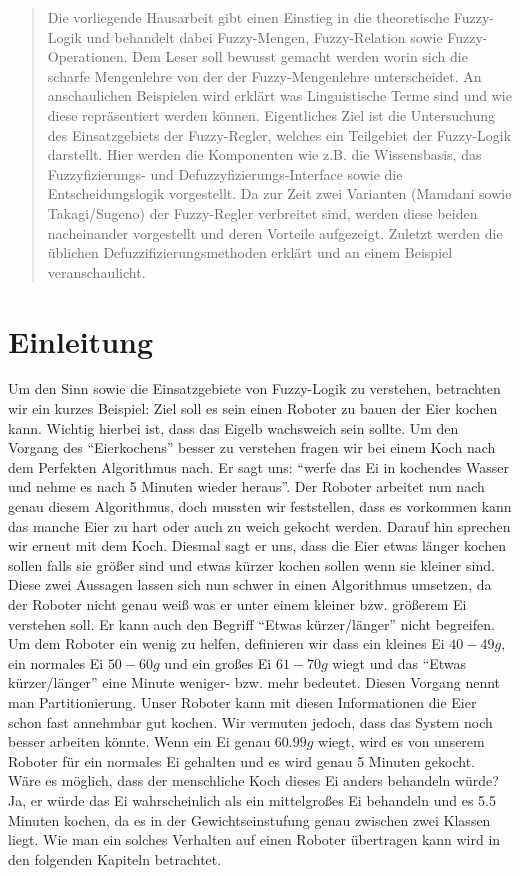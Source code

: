 \documentclass[12pt,a4paper,bibliography=totocnumbered,listof=totocnumbered, abstracton]{scrartcl}
\theoremstyle{Umgebung}
\begin{document}
\begin{abstract} 
Die vorliegende Hausarbeit gibt einen Einstieg in die theoretische Fuzzy-Logik und behandelt dabei Fuzzy-Mengen, Fuzzy-Relation sowie Fuzzy-Operationen. Dem Leser soll bewusst gemacht werden worin sich die scharfe Mengenlehre von der der Fuzzy-Mengenlehre unterscheidet. An anschaulichen Beispielen wird erklärt was Linguistische Terme sind und wie diese repräsentiert werden können. Eigentliches Ziel ist die Untersuchung des Einsatzgebiets der Fuzzy-Regler, welches ein Teilgebiet der Fuzzy-Logik darstellt. Hier werden die Komponenten wie z.B. die Wissensbasis, das Fuzzyfizierungs- und Defuzzyfizierungs-Interface sowie die Entscheidungslogik vorgestellt. Da zur Zeit zwei Varianten (Mamdani sowie Takagi/Sugeno)  der Fuzzy-Regler verbreitet sind, werden diese beiden nacheinander vorgestellt und deren Vorteile aufgezeigt. Zuletzt werden die üblichen Defuzzifizierungsmethoden erklärt und an einem Beispiel veranschaulicht.
\end{abstract} 
\newpage

\section{Einleitung}

Um den Sinn sowie die Einsatzgebiete von Fuzzy-Logik zu verstehen, betrachten wir ein kurzes Beispiel: Ziel soll es sein einen Roboter zu bauen der Eier kochen kann. Wichtig hierbei ist, dass das Eigelb wachsweich sein sollte. Um den Vorgang des \enquote{Eierkochens} besser zu verstehen fragen wir bei einem Koch nach dem Perfekten Algorithmus nach. Er sagt uns: \enquote{werfe das Ei in kochendes Wasser und nehme es nach 5 Minuten wieder heraus}. Der Roboter arbeitet nun nach genau diesem Algorithmus, doch mussten wir feststellen, dass es vorkommen kann das manche Eier zu hart oder auch zu weich gekocht werden. Darauf hin sprechen wir erneut mit dem Koch. Diesmal sagt er uns, dass die Eier etwas länger kochen sollen falls sie größer sind und etwas kürzer kochen sollen wenn sie kleiner sind. Diese zwei Aussagen lassen sich nun schwer in einen Algorithmus umsetzen, da der Roboter nicht genau weiß was er unter einem kleiner bzw. größerem Ei verstehen soll. Er kann auch den Begriff \enquote{Etwas kürzer/länger} nicht begreifen. Um dem Roboter ein wenig zu helfen, definieren wir dass ein kleines Ei $40-49g$, ein normales Ei $50-60g$ und ein großes Ei $61-70g$ wiegt und das \enquote{Etwas kürzer/länger} eine Minute weniger- bzw. mehr bedeutet. Diesen Vorgang nennt man Partitionierung. Unser Roboter kann mit diesen Informationen die Eier schon fast annehmbar gut kochen. Wir vermuten jedoch, dass das System noch besser arbeiten könnte. Wenn ein Ei genau $60.99g$ wiegt, wird es von unserem Roboter für ein normales Ei gehalten und es wird genau 5 Minuten gekocht. Wäre es möglich, dass der menschliche Koch dieses Ei anders behandeln würde? Ja, er würde das Ei wahrscheinlich als ein mittelgroßes Ei behandeln und es 5.5 Minuten kochen, da es in der Gewichtseinstufung genau zwischen zwei Klassen liegt. Wie man ein solches Verhalten auf einen Roboter übertragen kann wird in den folgenden Kapiteln betrachtet.
\end{document}
